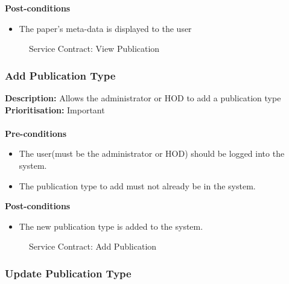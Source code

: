 \documentclass[a4paper]{article}
\begin{document}
        \textbf{Post-conditions}
        \begin{itemize}
            \item The paper's meta-data is displayed to the user
        \end{itemize}
        
                	\begin{figure}[H]
                		\centering
                		\caption{Service Contract: View Publication}
                	\end{figure}
        
         \pagebreak
    \subsubsection{Add Publication Type}

        \textbf{Description:} Allows the administrator or HOD to add a publication type \\
            \textbf{Prioritisation:} Important\\
            \\
            
            
        \textbf{Pre-conditions}
         \begin{itemize}
            \item The user(must be the administrator or HOD) should be logged into the system.
            \item The publication type to add must not already be in the system.
       \end{itemize}
        
        \textbf{Post-conditions}
        \begin{itemize}
            \item The new publication type is added to the system.
        \end{itemize}
        
            
            \begin{figure}[H]
            	\centering
            	\caption{Service Contract: Add Publication}
            \end{figure}
        
        \pagebreak
    \subsubsection{Update Publication Type}
        
\end{document}
